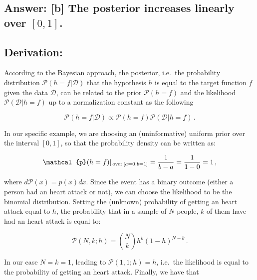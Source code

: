 \documentclass[11pt]{article}
\begin{document}
\hypertarget{answer-b-the-posterior-increases-linearly-over-01.}{%
\subsection{\texorpdfstring{Answer: {[}b{]} The posterior increases
linearly over
\([0,1]\).}{Answer: {[}b{]} The posterior increases linearly over {[}0,1{]}.}}\label{answer-b-the-posterior-increases-linearly-over-01.}}

\hypertarget{derivation}{%
\subsection{Derivation:}\label{derivation}}

According to the Bayesian approach, the posterior, i.e.~the probability
distribution \(\mathcal{P}(h=f|\mathcal{D})\) that the hypothesis \(h\)
is equal to the target function \(f\) given the data \(\mathcal{D}\),
can be related to the prior \(\mathcal{P}(h=f)\) and the likelihood
\(\mathcal{P}(\mathcal{D}|h=f)\) up to a normalization constant as the
following

\begin{equation}
\mathcal{P}(h=f|\mathcal{D})\propto \mathcal{P}(h=f) \mathcal{P}(\mathcal{D}|h=f)\,.
\end{equation}

In our specific example, we are choosing an (uninformative) uniform
prior over the interval \([0,1]\), so that the probability density can
be written as:

\begin{equation}
\mathcal{p}(h=f)|_{ {\rm\, over\,} [a=0,b=1]}= \frac{1}{b-a}=\frac{1}{1-0}=1\,,
\end{equation}

where \(d\mathcal{P}(x)=p(x)dx\). Since the event has a binary outcome
(either a person had an heart attack or not), we can choose the
likelihood to be the binomial distribution. Setting the (unknown)
probability of getting an heart attack equal to \(h\), the probability
that in a sample of \(N\) people, \(k\) of them have had an heart attack
is equal to:

\begin{equation}
\mathcal{P}(N,k;h)= {N\choose k}h^k(1-h)^{N-k}\,.
\end{equation}

In our case \(N=k=1\), leading to \(\mathcal{P}(1,1;h)=h\), i.e.~the
likelihood is equal to the probability of getting an heart attack.
Finally, we have that
\end{document}
